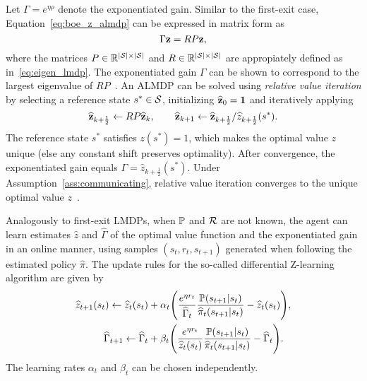 Let $\Gamma=e^{\eta\rho}$ denote the exponentiated gain. Similar to the first-exit case, Equation~\eqref{eq:boe_z_almdp} can be expressed in matrix form as
\begin{equation}\label{eq:rel_opt}
  \Gamma {\bf z} = R P {\bf z},
\end{equation}
where the matrices $P\in \mathbb{R}^{\lvert\mathcal{S}\rvert\times\lvert\mathcal{S}\rvert}$ and $R\in \mathbb{R}^{\lvert\mathcal{S}\rvert\times\lvert\mathcal{S}\rvert}$ are appropiately defined as in~\eqref{eq:eigen_lmdp}. The exponentiated gain $\Gamma$ can be shown to correspond to the largest eigenvalue of $RP$~\citep{Todorov2009}.
An ALMDP can be solved using {\em relative value iteration} by selecting a reference state $s^*\in\mathcal{S}$, initializing $\widehat{\bf z}_0={\bf 1}$ and iteratively applying
\begin{equation*}
  \widehat{\bf z}_{k+\frac 1 2} \gets R P \widehat{\bf z}_k, \quad \quad \widehat{\bf z}_{k+1} \gets \widehat{\bf z}_{k+\frac 1 2} / \widehat z_{k+\frac 1 2}(s^*).
\end{equation*}
The reference state $s^*$ satisfies $z(s^*)=1$, which makes the optimal value $z$ unique (else any constant shift preserves optimality). After convergence, the exponentiated gain equals $\Gamma=\widehat z_{k+\frac 1 2}(s^*)$. Under Assumption~\ref{ass:communicating}, relative value iteration converges to the unique optimal value $z$~\citep{Todorov2009}.

Analogously to first-exit LMDPs, when $\mathbb{P}$ and $\mathcal{R}$ are not known, the agent can learn estimates $\widehat z$ and $\widehat\Gamma$ of the optimal value function and the exponentiated gain in an online manner, using samples $(s_t, r_t, s_{t+1})$ generated when following the estimated policy $\widehat\pi$. The update rules for the so-called differential Z-learning algorithm are given by
\begin{align}
  \widehat{z}_{t+1}(s_t)  \gets \widehat{z}_{t}(s_{t}) & + \alpha_t \Bigg(\frac{e^{\eta r_t}}{\widehat\Gamma_t}\dfrac{\kernel(s_{t+1}\lvert s_t)}{\widehat\pi_t(s_{t+1}\lvert s_t)}  - \widehat z_t(s_t)\Bigg),\label{eq:update_z_e}  \\   %
  \widehat\Gamma_{t+1}    \gets \widehat\Gamma_t       & + \beta_t \Bigg(\frac{e^{\eta r_t}}{\widehat z_t(s_t)}\dfrac{\kernel(s_{t+1}\lvert s_t)}{\widehat\pi_t(s_{t+1}\lvert s_t)}  - \widehat \Gamma_t\Bigg).\label{eq:update_gamma}
\end{align}
The learning rates $\alpha_t$ and $\beta_t$ can be chosen independently.

